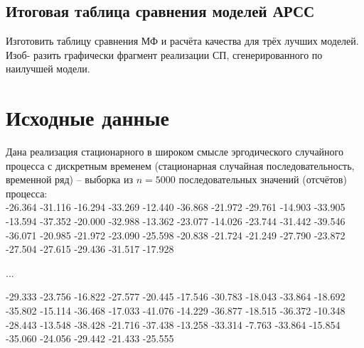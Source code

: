 \documentclass[12pt, fleqn]{article}
\begin{document}
{	\subsection{Итоговая таблица сравнения моделей АРСС}{
		Изготовить таблицу сравнения МФ и расчёта качества для трёх лучших моделей. Изоб-
		разить графически фрагмент реализации СП, сгенерированного по наилучшей модели.
	}
}

\newpage
\section{Исходные данные}
  
{
	Дана реализация стационарного в широком смысле эргодического случайного процесса с дискретным временем (стационарная случайная последовательность, временной ряд) – выборка из $n = 5000$ последовательных значений (отсчётов) процесса:\\
						  
-26.364 -31.116 -16.294 -33.269 -12.440 -36.868 -21.972 -29.761 -14.903 -33.905 -13.594 -37.352 -20.000 -32.988 -13.362 -23.077 -14.026 -23.744 -31.442 -39.546 -36.071 -20.985 -21.972 -23.090 -25.598 -20.838 -21.724 -21.249 -27.790 -23.872 -27.504 -27.615 -29.436 -31.517 -17.928

...

-29.333 -23.756 -16.822 -27.577 -20.445 -17.546 -30.783 -18.043 -33.864 -18.692 -35.802 -15.114 -36.468 -17.033 -41.076 -14.229 -36.877 -18.515 -36.372 -10.348 -28.443 -13.548 -38.428 -21.716 -37.438 -13.258 -33.314 -7.763 -33.864 -15.854 -35.060 -24.056 -29.442 -21.433 -25.555

		
						  
}


\newpage
\end{document}
